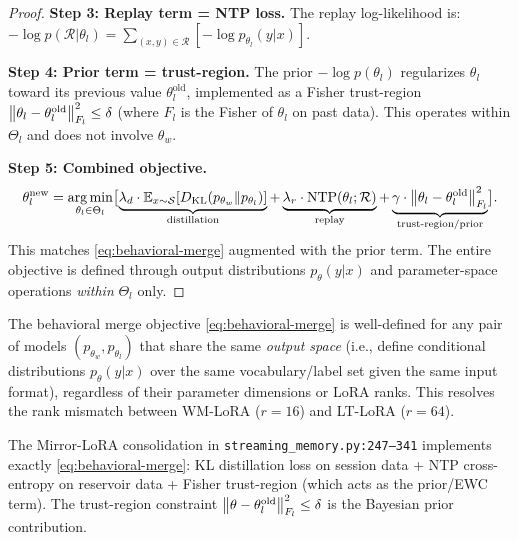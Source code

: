 \begin{proof}
\textbf{Step 3: Replay term = NTP loss.}
The replay log-likelihood is:
$-\log p(\mathcal{R}|\theta_l) = \sum_{(x,y) \in \mathcal{R}}
[-\log p_{\theta_l}(y|x)]$.

\textbf{Step 4: Prior term = trust-region.}
The prior $-\log p(\theta_l)$ regularizes $\theta_l$ toward its
previous value $\theta_l^{\mathrm{old}}$, implemented as a
Fisher trust-region $\left\|\theta_l - \theta_l^{\mathrm{old}}\right\|_{F_l}^2
\leq \delta$ (where $F_l$ is the Fisher of $\theta_l$ on past data).
This operates within $\Theta_l$ and does not involve $\theta_w$.

\textbf{Step 5: Combined objective.}
\[
  \theta_l^{\mathrm{new}} = \operatorname*{arg\,min}_{\theta_l \in \Theta_l}\bigl[
    \underbrace{\lambda_d \cdot \mathbb{E}_{x \sim \mathcal{S}}
      [D_{\mathrm{KL}}(p_{\theta_w}\|p_{\theta_l})]
    }_{\text{distillation}}
    + \underbrace{\lambda_r \cdot \text{NTP}(\theta_l; \mathcal{R})
    }_{\text{replay}}
    + \underbrace{\gamma \cdot
      \left\|\theta_l-\theta_l^{\mathrm{old}}\right\|_{F_l}^2
    }_{\text{trust-region/prior}}
  \bigr].
\]
This matches \eqref{eq:behavioral-merge} augmented with the prior
term. The entire objective is defined through output distributions
$p_\theta(y|x)$ and parameter-space operations \emph{within}
$\Theta_l$ only.
\end{proof}

\begin{corollary}
\label{cor:rank-agnostic}
The behavioral merge objective \eqref{eq:behavioral-merge} is well-defined
for any pair of models $(p_{\theta_w}, p_{\theta_l})$ that share the
same \emph{output space} (i.e., define conditional distributions
$p_\theta(y|x)$ over the same vocabulary/label set given the same
input format), regardless of their parameter dimensions or LoRA ranks.
This resolves the rank mismatch between WM-LoRA ($r=16$) and
LT-LoRA ($r=64$).
\end{corollary}

\begin{remark}
The Mirror-LoRA consolidation in \texttt{streaming\_memory.py:247--341}
implements exactly \eqref{eq:behavioral-merge}: KL distillation loss on
session data + NTP cross-entropy on reservoir data + Fisher trust-region
(which acts as the prior/EWC term). The trust-region constraint
$\left\|\theta - \theta_l^{\mathrm{old}}\right\|_{F_l}^2 \leq \delta$ is the
Bayesian prior contribution.
\end{remark}
